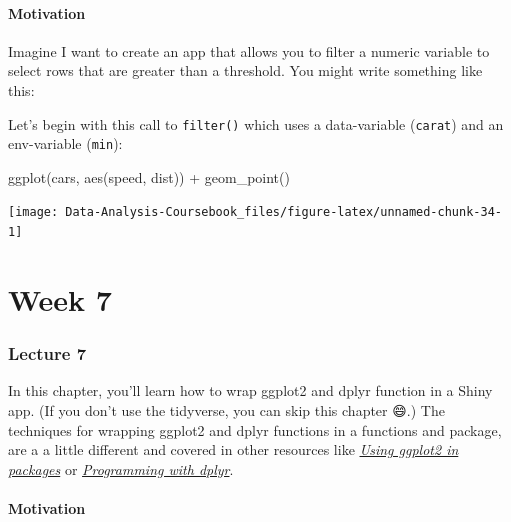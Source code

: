 \documentclass[
]{article}
\newenvironment{Shaded}{\begin{snugshade}}{\end{snugshade}}
\newcommand{\FunctionTok}[1]{\textcolor[rgb]{0.00,0.00,0.00}{#1}}
\newcommand{\NormalTok}[1]{#1}
\newcommand{\SpecialCharTok}[1]{\textcolor[rgb]{0.00,0.00,0.00}{#1}}
\begin{document}
\hypertarget{tidy-motivation}{%
\subsection{Motivation}\label{tidy-motivation}}

Imagine I want to create an app that allows you to filter a numeric variable to select rows that are greater than a threshold.
You might write something like this:

Let's begin with this call to \texttt{filter()} which uses a data-variable (\texttt{carat}) and an env-variable (\texttt{min}):

\begin{Shaded}
\begin{Highlighting}[]
\FunctionTok{ggplot}\NormalTok{(cars, }\FunctionTok{aes}\NormalTok{(speed, dist)) }\SpecialCharTok{+} 
  \FunctionTok{geom\_point}\NormalTok{()}
\end{Highlighting}
\end{Shaded}

\begin{center}\texttt{[image: Data-Analysis-Coursebook\_files/figure-latex/unnamed-chunk-34-1]} \end{center}

\hypertarget{part-week-7}{%
\part*{Week 7}\label{part-week-7}}

\hypertarget{lecture7}{%
\section{Lecture 7}\label{lecture7}}

In this chapter, you'll learn how to wrap ggplot2 and dplyr function in a Shiny app.
(If you don't use the tidyverse, you can skip this chapter 😄.) The techniques for wrapping ggplot2 and dplyr functions in a functions and package, are a a little different and covered in other resources like \href{http://ggplot2.tidyverse.org/dev/articles/ggplot2-in-packages.html}{\emph{Using ggplot2 in packages}} or \href{http://dplyr.tidyverse.org/articles/programming.html}{\emph{Programming with dplyr}}.

\hypertarget{tidy-motivation}{%
\subsection{Motivation}\label{tidy-motivation}}
\end{document}

